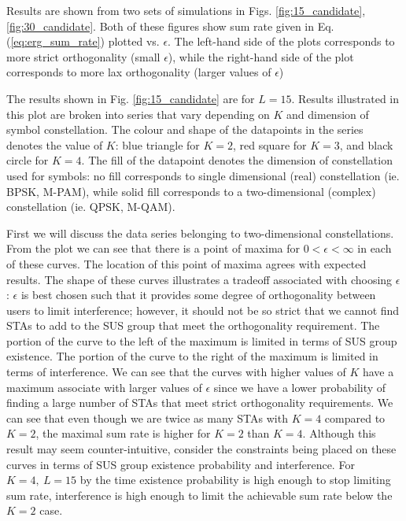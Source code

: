 
Results are shown from two sets of simulations in Figs. \ref{fig:15_candidate},\ref{fig:30_candidate}. Both of these figures show sum rate given in Eq. (\ref{eq:erg_sum_rate}) plotted vs. $\epsilon$. The left-hand side of the plots corresponds to more strict orthogonality (small $\epsilon$), while the right-hand side of the plot corresponds to more lax orthogonality (larger values of $\epsilon$)

The results shown in Fig. \ref{fig:15_candidate} are for $L = 15$. Results illustrated in this plot are broken into series that vary depending on $K$ and dimension of symbol constellation. The colour and shape of the datapoints in the series denotes the value of $K$: blue triangle for $K=2$, red square for $K=3$, and black circle for $K=4$. The fill of the datapoint denotes the dimension of constellation used for symbols: no fill corresponds to single dimensional (real) constellation (ie. BPSK, M-PAM), while solid fill corresponds to a two-dimensional (complex) constellation (ie. QPSK, M-QAM).

First we will discuss the data series belonging to two-dimensional constellations. From the plot we can see that there is a point of maxima for $0 < \epsilon < \infty$ in each of these curves. The location of this point of maxima agrees with expected results. The shape of these curves illustrates a tradeoff associated with choosing $\epsilon$: $\epsilon$ is best chosen such that it provides some degree of orthogonality between users to limit interference; however, it should not be so strict that we cannot find STAs to add to the SUS group that meet the orthogonality requirement. The portion of the curve to the left of the maximum is limited in terms of SUS group existence. The portion of the curve to the right of the maximum is limited in terms of interference. We can see that the curves with higher values of $K$ have a maximum associate with larger values of $\epsilon$ since we have a lower probability of finding a large number of STAs that meet strict orthogonality requirements. We can see that even though we are twice as many STAs with $K=4$ compared to $K=2$, the maximal sum rate is higher for $K=2$ than $K=4$. Although this result may seem counter-intuitive, consider the constraints being placed on these curves in terms of SUS group existence probability and interference. For $K=4,\ L = 15$ by the time existence probability is high enough to stop limiting sum rate, interference is high enough to limit the achievable sum rate below the $K=2$ case.

